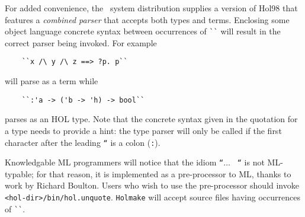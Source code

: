 For added convenience, the \HOL\ system distribution supplies a version 
of Hol98 that features a {\it combined parser\/} that accepts both types
and terms. Enclosing some object language concrete syntax between
occurrences of \verb+``+ will result in the correct parser being
invoked. For example  

\begin{verbatim}
    ``x /\ y /\ z ==> ?p. p``
\end{verbatim}

\noindent will parse as a term while

\begin{verbatim}
    ``:'a -> ('b -> 'h) -> bool``
\end{verbatim}

\noindent parses as an HOL type. Note that the concrete syntax given in
the quotation for a type needs to provide a hint: the type parser will
only be called if the first character after the leading {\tt ``} is a
colon (\verb+:+). 

Knowledgable ML programmers will notice that the idiom {\tt ``}$\ldots$ {\tt
  ``} is not ML-typable; for that reason, it is implemented as a
  pre-processor to ML, thanks to work by Richard Boulton. Users who wish
  to use the pre-processor should invoke {\tt
  <hol-dir>/bin/hol.unquote}. {\small\verb+Holmake+} will accept
  source files having occurrences of \verb+``+.

